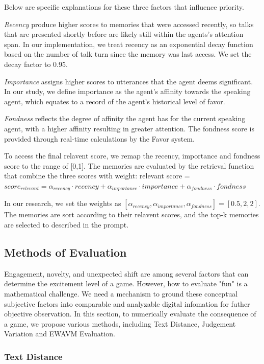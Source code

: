 \documentclass[11pt]{article}
\begin{document}
Below are specific explanations for these three factors that influence priority.

\textit{Recency} produce higher scores to memories that were accessed recently, so talks that are presented shortly before are likely still within the agents's attention span. In our implementation, we treat recency as an exponential decay function based on the number of talk turn since the memory was last access. We set the decay factor to 0.95.

\textit{Importance} assigns higher scores to utterances that the agent deems significant. In our study, we define importance as the agent's affinity towards the speaking agent, which equates to a record of the agent’s historical level of favor.

\textit{Fondness} reflects the degree of affinity the agent has for the current speaking agent, with a higher affinity resulting in greater attention. The fondness score is provided through real-time calculations by the Favor system.

To access the final relavent score, we remap the recency, importance and fondness score to the range of [0,1]. The memories are evaluated by the retrieval function that combine the three scores with weight: relevant score = $ score_{relevant}=\alpha_{recency}\cdot recency+\alpha_{importance}\cdot importance+ \alpha_{fondness}\cdot fondness $

In our research, we set the weights as  $ [\alpha_{recency},\alpha_{importance},\alpha_{fondness}]=[0.5,2,2] $. The memories are sort according to their relavent scores, and the top-k memories are selected to described in the prompt. 

\subsection{Methods of Evaluation} \label{sec:Evaluation}

Engagement, novelty, and unexpected shift are among several factors that can determine the excitement level of a game. However, how to evaluate "fun" is a mathematical challenge. We need a mechanism to ground these conceptual subjective factors into comparable and analyzable digital infomation for futher objective observation. In this section, to numerically evaluate the consequence of a game, we propose various methods, including Text Distance, Judgement Variation and EWAVM Evaluation.

\subsubsection{Text Distance} \label{sec:Evaluation_TextDistance}
\end{document}
